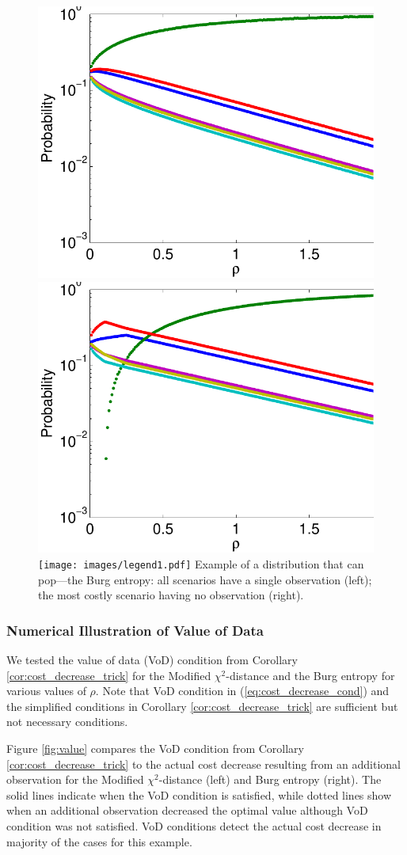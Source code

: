 \documentclass[opre,nonblindrev]{informs3} %
\begin{document}
\begin{figure}[h]
	\FIGURE
	{%
		\includegraphics*[width=.40\textwidth]{images/burg}%
		\includegraphics*[width=.40\textwidth]{images/burg_zero}%
		\texttt{[image: images/legend1.pdf]}
	}
	{
		Example of a distribution that can pop---the Burg entropy: 
		all scenarios have a single observation (left); 
		 the most costly scenario having no observation (right).
		\label{fig:pop}
	}
	{}
\end{figure}

\subsubsection{Numerical Illustration of Value of Data}
\label{ssec:numerical_value_of_data}

We tested the value of data (VoD) condition from Corollary \ref{cor:cost_decrease_trick} for the Modified $\chi^2$-distance and the Burg entropy for various values of $\rho$. 
Note that VoD condition in (\ref{eq:cost_decrease_cond}) and the simplified conditions in Corollary \ref{cor:cost_decrease_trick} are sufficient but not necessary conditions.

Figure \ref{fig:value} compares the VoD condition from Corollary \ref{cor:cost_decrease_trick} to the actual cost decrease resulting from an additional observation for the Modified $\chi^2$-distance (left) and Burg entropy (right). 
The solid lines indicate when the VoD condition is satisfied, while dotted lines show when an additional observation decreased the optimal value although VoD condition was not satisfied.
VoD conditions detect the actual cost decrease in majority of the cases for this example. 
\end{document}
